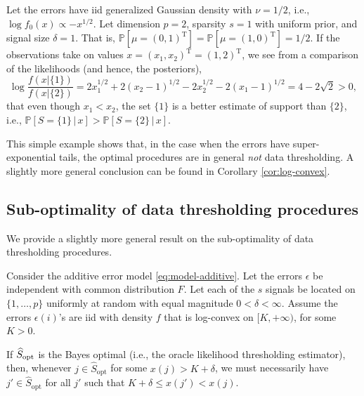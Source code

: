 \begin{example} \label{exmp:suboptimal-data-thresholding}
Let the errors have iid generalized Gaussian density with $\nu=1/2$, i.e., $\log{f_0(x)}\propto -x^{1/2}$. 
Let dimension $p=2$, sparsity $s=1$ with uniform prior, and signal size $\delta=1$.
That is, $\mathbb P[\mu = (0,1)^\mathrm{T}] = \mathbb P[\mu = (1,0)^\mathrm{T}] = 1/2$.
If the observations take on values $x = (x_1, x_2)^\mathrm{T} = (1,2)^\mathrm{T}$, we see from a comparison of the likelihoods (and hence, the posteriors),
$$
\log \frac{f(x|\{1\})}{f(x|\{2\})} = 2x_1^{1/2} + 2(x_2 - 1)^{1/2} - 2x_2^{1/2} - 2(x_1 - 1)^{1/2} = 4 - 2\sqrt{2} > 0,
$$
that even though $x_1<x_2$, the set $\{1\}$ is a better estimate of support than $\{2\}$, i.e., $\mathbb P[S=\{1\}\,\big|\,x] > \mathbb P[S=\{2\}\,\big|\,x]$.
\end{example}

This simple example shows that, in the case when the errors have super-exponential tails, the optimal procedures are in general \emph{not} data thresholding.
A slightly more general conclusion can be found in Corollary \ref{cor:log-convex}.

\subsection{Sub-optimality of data thresholding procedures}\label{sec:sup-optimality-of-thresholding}

We provide a slightly more general result on the sub-optimality of data thresholding procedures.

\begin{corollary} \label{cor:log-convex}
Consider the additive error model \eqref{eq:model-additive}.
Let the errors $\epsilon$ be independent with common distribution $F$.
Let each of the $s$ signals be located on $\{1,\ldots,p\}$ uniformly at random with equal magnitude $0<\delta<\infty$.
Assume the errors $\epsilon(i)$'s are iid with density $f$ that is log-convex on $[K, +\infty)$, for some $K>0$. 

If $\widehat{S}_{\rm opt}$ is the Bayes optimal (i.e., the oracle likelihood thresholding estimator), then, whenever 
$j\in\widehat{S}_{\text{opt}}$ for some $x(j) > K+\delta$, we must necessarily have $j'\in\widehat{S}_{\text{opt}}$ for 
all $j'$ such that $K+\delta \le x(j') < x(j)$.
\end{corollary} 

